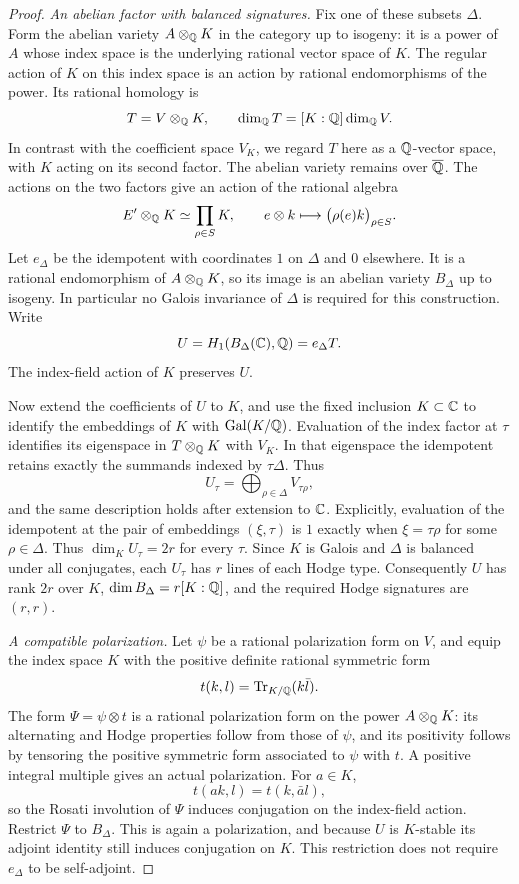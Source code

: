 \begin{proof}
\medskip\noindent
\emph{An abelian factor with balanced signatures.}
Fix one of these subsets $\Delta$.  Form the abelian variety
$A\otimes_{\mathbb Q}K$ in the category up to isogeny: it is a power of $A$
whose index space is the underlying rational vector space of $K$.
The regular action of $K$ on this index space is an action by rational
endomorphisms of the power.  Its rational homology is
\[
 T=V\otimes_{\mathbb Q}K,\qquad
 \dim_\mathbb Q T=[K:\mathbb Q]\dim_\mathbb Q V.
\]
In contrast with the coefficient space $V_K$, we regard $T$ here as a
$\mathbb Q$-vector space, with $K$ acting on its second factor.  The abelian
variety remains over $\overline{\mathbb Q}$.  The actions on the two factors give
an action of the rational algebra
\[
 E'\otimes_{\mathbb Q}K\simeq\prod_{\rho\in S}K,
 \qquad e\otimes k\longmapsto\bigl(\rho(e)k\bigr)_{\rho\in S}.
\]
Let $e_\Delta$ be the idempotent with coordinates $1$ on $\Delta$ and
$0$ elsewhere.  It is a rational endomorphism of $A\otimes_{\mathbb Q}K$,
so its image is an abelian variety $B_\Delta$ up to isogeny.  In
particular no Galois invariance of $\Delta$ is required for this
construction.  Write
\[
                   U=H_1(B_\Delta(\mathbb C),\mathbb Q)=e_\Delta T.
\]
The index-field action of $K$ preserves $U$.

Now extend the coefficients of $U$ to $K$, and use the fixed inclusion
$K\subset\mathbb C$ to identify the embeddings of $K$ with $\operatorname{Gal}(K/\mathbb Q)$.
Evaluation of the index factor at $\tau$ identifies its eigenspace in
$T\otimes_\mathbb Q K$ with $V_K$.  In that eigenspace the idempotent retains
exactly the summands indexed by $\tau\Delta$.  Thus
\begin{equation}
\label{eq:cm-embedding-summand}
                  U_\tau=\bigoplus_{\rho\in\Delta}V_{\tau\rho},
\end{equation}
and the same description holds after extension to $\mathbb C$.  Explicitly,
evaluation of the idempotent at the pair of embeddings $(\xi,\tau)$ is $1$ exactly
when $\xi=\tau\rho$ for some $\rho\in\Delta$.  Thus
$\dim_K U_\tau=2r$ for every $\tau$.  Since $K$ is Galois and
$\Delta$ is balanced under all conjugates, each $U_\tau$ has $r$ lines
of each Hodge type.  Consequently $U$ has rank $2r$ over $K$,
$\dim B_\Delta=r[K:\mathbb Q]$, and the required Hodge signatures are
$(r,r)$.

\medskip\noindent
\emph{A compatible polarization.}
Let $\psi$ be a
rational polarization form on $V$, and equip the index space $K$ with
the positive definite rational symmetric form
\[
                       t(k,l)=\operatorname{Tr}_{K/\mathbb Q}(k\bar l).
\]
The form $\Psi=\psi\otimes t$ is a rational polarization form on the
power $A\otimes_{\mathbb Q}K$: its alternating and Hodge properties follow
from those of $\psi$, and its positivity follows by tensoring the
positive symmetric form associated to $\psi$ with $t$.  A positive
integral multiple gives an actual polarization.  For $a\in K$,
\[
                       t(ak,l)=t(k,\bar a l),
\]
so the Rosati involution of $\Psi$ induces conjugation on the
index-field action.  Restrict $\Psi$ to $B_\Delta$.  This is again a
polarization, and because $U$ is $K$-stable its adjoint identity still
induces conjugation on $K$.  This restriction does not require
$e_\Delta$ to be self-adjoint.


\end{proof}
